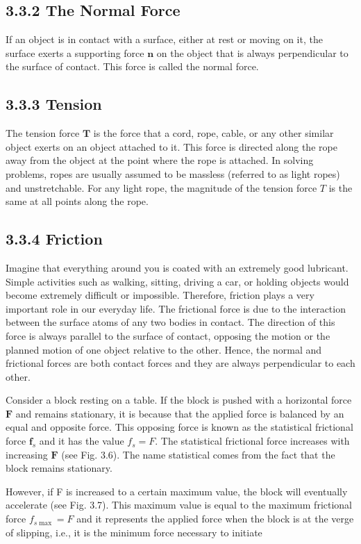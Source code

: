 \documentclass[10pt]{article}
\begin{document}
\subsection*{3.3.2 The Normal Force}
If an object is in contact with a surface, either at rest or moving on it, the surface exerts a supporting force $\mathbf{n}$ on the object that is always perpendicular to the surface of contact. This force is called the normal force.

\subsection*{3.3.3 Tension}
The tension force $\mathbf{T}$ is the force that a cord, rope, cable, or any other similar object exerts on an object attached to it. This force is directed along the rope away from the object at the point where the rope is attached. In solving problems, ropes are usually assumed to be massless (referred to as light ropes) and unstretchable. For any light rope, the magnitude of the tension force $T$ is the same at all points along the rope.

\subsection*{3.3.4 Friction}
Imagine that everything around you is coated with an extremely good lubricant. Simple activities such as walking, sitting, driving a car, or holding objects would become extremely difficult or impossible. Therefore, friction plays a very important role in our everyday life. The frictional force is due to the interaction between the surface atoms of any two bodies in contact. The direction of this force is always parallel to the surface of contact, opposing the motion or the planned motion of one object relative to the other. Hence, the normal and frictional forces are both contact forces and they are always perpendicular to each other.

Consider a block resting on a table. If the block is pushed with a horizontal force $\mathbf{F}$ and remains stationary, it is because that the applied force is balanced by an equal and opposite force. This opposing force is known as the statistical frictional force $\mathbf{f}_{s}$ and it has the value $f_{s}=F$. The statistical frictional force increases with increasing $\mathbf{F}$ (see Fig. 3.6). The name statistical comes from the fact that the block remains stationary.

However, if F is increased to a certain maximum value, the block will eventually accelerate (see Fig. 3.7). This maximum value is equal to the maximum frictional force $f_{s \max }=F$ and it represents the applied force when the block is at the verge of slipping, i.e., it is the minimum force necessary to initiate
\end{document}
